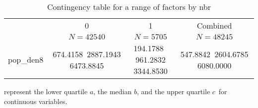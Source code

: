 %
\begin{table}[!tbp]
\caption{Contingency table for a range of factors by nbr\label{tab:1b}} 
\begin{center}
\begin{tabular}{lccc}
\hline\hline
\multicolumn{1}{l}{}&\multicolumn{1}{c}{0}&\multicolumn{1}{c}{1}&\multicolumn{1}{c}{Combined}\tabularnewline
&\multicolumn{1}{c}{{\scriptsize $N=42540$}}&\multicolumn{1}{c}{{\scriptsize $N=5705$}}&\multicolumn{1}{c}{{\scriptsize $N=48245$}}\tabularnewline
\hline
pop\_den8&{\scriptsize  674.4158~}{2887.1943 }{\scriptsize 6473.8845} &{\scriptsize  194.1788~}{ 961.2832 }{\scriptsize 3344.8530} &{\scriptsize  547.8842~}{2604.6785 }{\scriptsize 6080.0000} \tabularnewline
\hline
\end{tabular}
\end{center}
 represent the lower quartile $a$, the median $b$, and the upper quartile $c$\ for continuous variables.\end{table}

